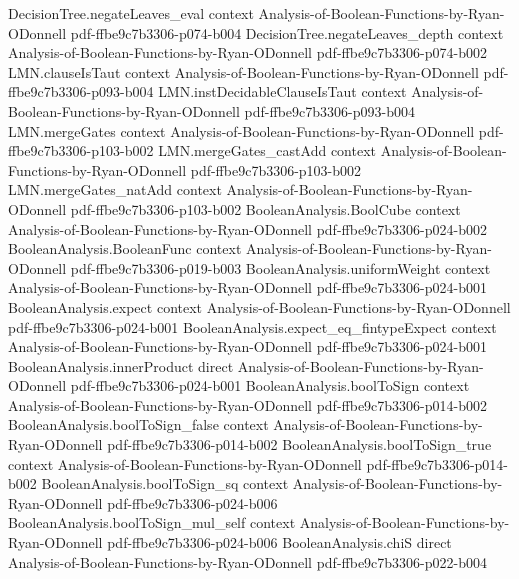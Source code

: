 \begin{lemma}
\proofstep
  {DecisionTree.negateLeaves_eval}
  {context}
  {Analysis-of-Boolean-Functions-by-Ryan-ODonnell}
  {pdf-ffbe9c7b3306-p074-b004}
\proofstep
  {DecisionTree.negateLeaves_depth}
  {context}
  {Analysis-of-Boolean-Functions-by-Ryan-ODonnell}
  {pdf-ffbe9c7b3306-p074-b002}
\proofstep
  {LMN.clauseIsTaut}
  {context}
  {Analysis-of-Boolean-Functions-by-Ryan-ODonnell}
  {pdf-ffbe9c7b3306-p093-b004}
\proofstep
  {LMN.instDecidableClauseIsTaut}
  {context}
  {Analysis-of-Boolean-Functions-by-Ryan-ODonnell}
  {pdf-ffbe9c7b3306-p093-b004}
\proofstep
  {LMN.mergeGates}
  {context}
  {Analysis-of-Boolean-Functions-by-Ryan-ODonnell}
  {pdf-ffbe9c7b3306-p103-b002}
\proofstep
  {LMN.mergeGates_castAdd}
  {context}
  {Analysis-of-Boolean-Functions-by-Ryan-ODonnell}
  {pdf-ffbe9c7b3306-p103-b002}
\proofstep
  {LMN.mergeGates_natAdd}
  {context}
  {Analysis-of-Boolean-Functions-by-Ryan-ODonnell}
  {pdf-ffbe9c7b3306-p103-b002}
\proofstep
  {BooleanAnalysis.BoolCube}
  {context}
  {Analysis-of-Boolean-Functions-by-Ryan-ODonnell}
  {pdf-ffbe9c7b3306-p024-b002}
\proofstep
  {BooleanAnalysis.BooleanFunc}
  {context}
  {Analysis-of-Boolean-Functions-by-Ryan-ODonnell}
  {pdf-ffbe9c7b3306-p019-b003}
\proofstep
  {BooleanAnalysis.uniformWeight}
  {context}
  {Analysis-of-Boolean-Functions-by-Ryan-ODonnell}
  {pdf-ffbe9c7b3306-p024-b001}
\proofstep
  {BooleanAnalysis.expect}
  {context}
  {Analysis-of-Boolean-Functions-by-Ryan-ODonnell}
  {pdf-ffbe9c7b3306-p024-b001}
\proofstep
  {BooleanAnalysis.expect_eq_fintypeExpect}
  {context}
  {Analysis-of-Boolean-Functions-by-Ryan-ODonnell}
  {pdf-ffbe9c7b3306-p024-b001}
\proofstep
  {BooleanAnalysis.innerProduct}
  {direct}
  {Analysis-of-Boolean-Functions-by-Ryan-ODonnell}
  {pdf-ffbe9c7b3306-p024-b001}
\proofstep
  {BooleanAnalysis.boolToSign}
  {context}
  {Analysis-of-Boolean-Functions-by-Ryan-ODonnell}
  {pdf-ffbe9c7b3306-p014-b002}
\proofstep
  {BooleanAnalysis.boolToSign_false}
  {context}
  {Analysis-of-Boolean-Functions-by-Ryan-ODonnell}
  {pdf-ffbe9c7b3306-p014-b002}
\proofstep
  {BooleanAnalysis.boolToSign_true}
  {context}
  {Analysis-of-Boolean-Functions-by-Ryan-ODonnell}
  {pdf-ffbe9c7b3306-p014-b002}
\proofstep
  {BooleanAnalysis.boolToSign_sq}
  {context}
  {Analysis-of-Boolean-Functions-by-Ryan-ODonnell}
  {pdf-ffbe9c7b3306-p024-b006}
\proofstep
  {BooleanAnalysis.boolToSign_mul_self}
  {context}
  {Analysis-of-Boolean-Functions-by-Ryan-ODonnell}
  {pdf-ffbe9c7b3306-p024-b006}
\proofstep
  {BooleanAnalysis.chiS}
  {direct}
  {Analysis-of-Boolean-Functions-by-Ryan-ODonnell}
  {pdf-ffbe9c7b3306-p022-b004}
\proofstep

\end{lemma}
